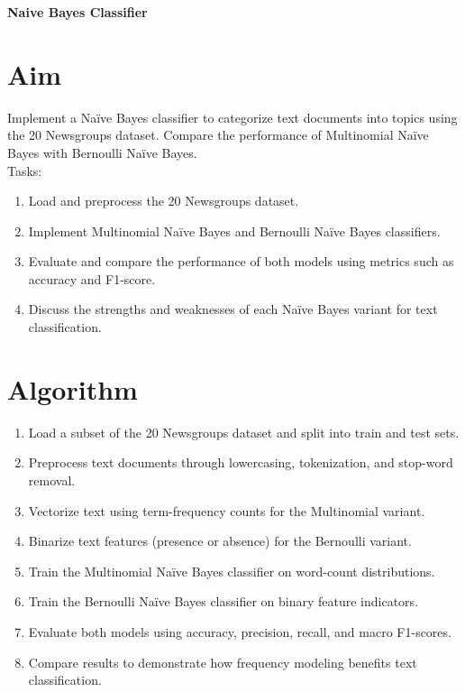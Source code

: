 \documentclass[12pt, a4paper]{report}
\begin{document}
\begin{center}
	{\bfseries \Huge Naive Bayes Classifier}	
\end{center}

\section*{Aim} 
Implement a Naïve Bayes classifier to categorize text documents into topics using the 20 Newsgroups dataset.
Compare the performance of Multinomial Naïve Bayes with Bernoulli Naïve Bayes. \\
Tasks:
\begin{enumerate}[\quad -]
	\itemsep 0em 
	
	\item Load and preprocess the 20 Newsgroups dataset.
	\item Implement Multinomial Naïve Bayes and Bernoulli Naïve Bayes classifiers.
	\item Evaluate and compare the performance of both models using metrics such as accuracy and F1-score.
	\item Discuss the strengths and weaknesses of each Naïve Bayes variant for text classification.
\end{enumerate}

\section*{Algorithm} 
\begin{enumerate}
	\item Load a subset of the 20 Newsgroups dataset and split into train and test sets.
	\item Preprocess text documents through lowercasing, tokenization, and stop-word removal.
	\item Vectorize text using term-frequency counts for the Multinomial variant.
	\item Binarize text features (presence or absence) for the Bernoulli variant.
	\item Train the Multinomial Naïve Bayes classifier on word-count distributions.
	\item Train the Bernoulli Naïve Bayes classifier on binary feature indicators.
	\item Evaluate both models using accuracy, precision, recall, and macro F1-scores.
	\item Compare results to demonstrate how frequency modeling benefits text classification.
\end{enumerate}
\end{document}
